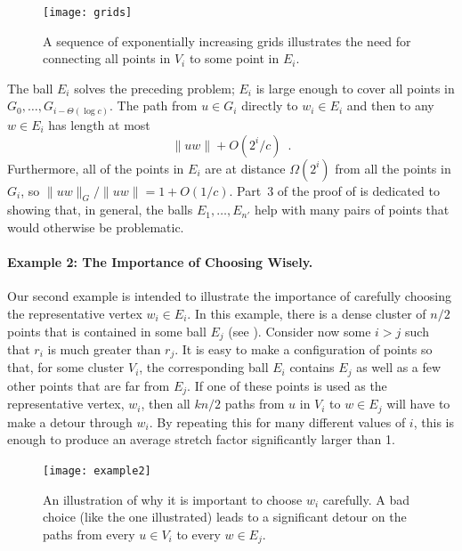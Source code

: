 \documentclass{patmorin}
\begin{document}
\begin{figure}
  \begin{center}
    \texttt{[image: grids]}
  \end{center}
  \caption{A sequence of exponentially increasing grids illustrates the
   need for connecting all points in $V_i$ to some point in $E_i$.}
\end{figure}

The ball $E_i$ solves the preceding problem; $E_i$ is large enough
to cover all points in $G_0,\ldots,G_{i-\Theta(\log c)}$.  The path
from $u\in G_i$ directly to $w_i\in E_i$ and then to any $w\in E_i$
has length at most
\[
    \|uw\| + O(2^{i}/c) \enspace .
\]
Furthermore, all of the points in $E_i$ are at distance $\Omega(2^i)$ from
all the points in $G_i$, so $\|uw\|_G/\|uw\| = 1+O(1/c)$.  Part~3 of the
proof of  is dedicated to showing that, in general,
the balls $E_1,\ldots,E_{n'}$ help with many pairs of points that would
otherwise be problematic.


\paragraph{Example 2: The Importance of Choosing Wisely.}
Our second example is intended to illustrate the importance of carefully
choosing the representative vertex $w_i\in E_i$.   In this example, there
is a dense cluster of $n/2$ points that is contained in some ball $E_j$
(see ).  Consider now some $i>j$ such that $r_i$ is
much greater than $r_j$.  It is easy to make a configuration of points so
that, for some cluster $V_i$, the corresponding ball $E_i$ contains $E_j$
as well as a few other points that are far from $E_j$. If one of these
points is used as the representative vertex, $w_i$, then all $kn/2$ paths
from $u$ in $V_i$ to $w\in E_j$ will have to make a detour through $w_i$.
By repeating this for many different values of $i$, this is enough to
produce an average stretch factor significantly larger than 1.

\begin{figure}
  \begin{center}
    \texttt{[image: example2]}
  \end{center}
  \caption{An illustration of why it is important to choose $w_i$ carefully.
    A bad choice (like the one illustrated) leads to a significant detour
    on the paths from every $u\in V_i$ to every $w\in E_j$.}
\end{figure}
\end{document}
